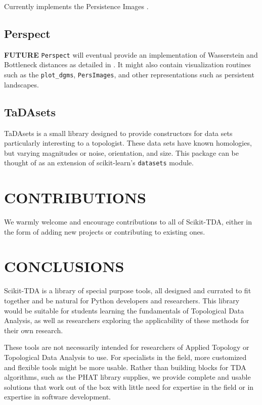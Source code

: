\documentclass[letterpaper, 10 pt, conference]{ieeeconf}  %
\begin{document}
Currently implements the Persistence Images \cite{adams2017persistence}.

\subsection{Perspect}

\textbf{FUTURE} \texttt{Perspect} will eventual provide an implementation of Wasserstein and Bottleneck distances as detailed in \cite{kerber2017geometry}. It might also contain visualization routines such as the \texttt{plot\_dgms}, \texttt{PersImages}, and other representations such as persistent landscapes. 

\subsection{TaDAsets}

TaDAsets is a small library designed to provide constructors for data sets particularly interesting to a topologist. These data sets have known homologies, but varying magnitudes or noise, orientation, and size. 
This package can be thought of as an extension of scikit-learn's \texttt{datasets} module.

\section{CONTRIBUTIONS}

We warmly welcome and encourage contributions to all of Scikit-TDA, either in the form of adding new projects or contributing to existing ones. 

\section{CONCLUSIONS}

Scikit-TDA is a library of special purpose tools, all designed and currated to fit together and be natural for Python developers and researchers. This library would be suitable for students learning the fundamentals of Topological Data Analysis, as well as researchers exploring the applicability of these methods for their own research.

These tools are not necessarily intended for researchers of Applied Topology or Topological Data Analysis to use. For specialists in the field, more customized and flexible tools might be more usable. Rather than building blocks for TDA algorithms, such as the PHAT library supplies, we provide complete and usable solutions that work out of the box with little need for expertise in the field or in expertise in software development.



 

\end{document}

